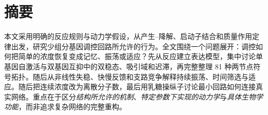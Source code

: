 \maketitle\setcounter{page}{2}
\chapter*{摘要}
本文采用明确的反应规则与动力学假设，从产生--降解、启动子结合和质量作用定律出发，研究少组分基因调控回路所允许的行为。全文围绕一个问题展开：调控如何把简单的浓度恢复变成记忆、振荡或适应？先从反应建立表达模型，集中讨论单基因自激活与双基因互抑中的双稳态、吸引域和迟滞，再完整整理 81 种两节点符号拓扑。随后从非线性失稳、快慢反馈和支路竞争解释持续振荡、时间筛选与适应。随后把连续浓度改为离散分子数，最后用乳糖操纵子讨论最小回路如何连接真实网络。重点在于区分\emph{结构所允许的机制}、\emph{特定参数下实现的动力学}与\emph{具体生物学功能}，而非追求复杂网络的完整重构。

\clearpage{\footnotesize\linespread{.93}\selectfont\setlength{\parskip}{0pt}\tableofcontents}\clearpage
